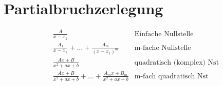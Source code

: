 \section{Partialbruchzerlegung}
\begin{tcolorbox}[colback=white!10!white,colframe=blue!50!black,title=Regeln]
	\begin{align*}
		&\frac{A}{x-x_1}&\text{Einfache Nullstelle}\\
		&\frac{A_1}{x-x_1}+ \ldots + \frac{A_m}{(x-x_1)^m }&\text{m-fache Nullstelle}\\
		&\frac{Ax+B}{x^2+ax+b} &\text{quadratisch (komplex) Nst}\\
		&\frac{Ax+B}{x^2+ax+b}+ \ldots + \frac{A_mx+B_m}{x^2+ax+b} &\text{m-fach quadratisch Nst}\\
	\end{align*}
\end{tcolorbox}